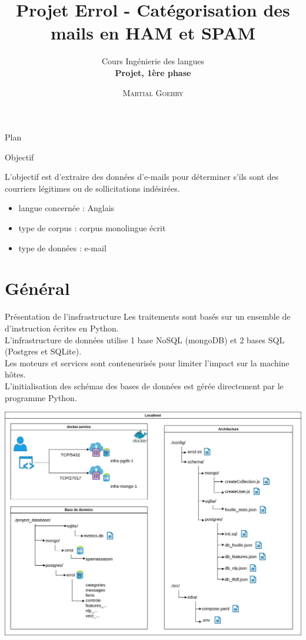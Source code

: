 \documentclass[xelatex,11pt, xcolor=dvipsnames]{beamer}
\subtitle{Cours Ingénierie des langues\\\textbf{Projet, 1ère phase}}
\institute{\normalsize Université Paris 8, LIASD\\
Licence d'informatique}
\title{Projet Errol - Catégorisation des mails en HAM et SPAM}
\author[\textsc{M. Goehry}]{\textsc{Martial Goehry}}
\begin{document}
{ 
  \begin{frame}
  \titlepage
  \end{frame}

\note{
}
}

\begin{frame}{Plan}
  \tableofcontents[sectionstyle=show/show, hidesubsections]
\note{
}  
\end{frame}

\begin{frame}{Objectif}
	\begin{block}{}
		L'objectif est d'extraire des données d'e-mails pour déterminer s'ils sont des courriers légitimes ou de sollicitations indésirées.
	\end{block}
	\begin{itemize}
		\item langue concernée : Anglais
		\item type de corpus : corpus monolingue écrit
		\item type de données : e-mail
	\end{itemize}
\end{frame}


\section{Général}

\begin{frame}{Présentation de l'insfrastructure}
	Les traitements sont basés sur un ensemble de d'instruction écrites en Python.\\
	L'infrastructure de données utilise 1 base NoSQL (mongoDB) et 2 bases SQL (Postgres et SQLite).\\
	Les moteurs et services sont conteneurisés pour limiter l'impact sur la machine hôtes.\\
	L'initialisation des schémas des bases de données est gérée directement par le programme Python.\\
\end{frame}

\begin{frame}
	\includegraphics[width=\linewidth]{img/SchemaDocker}
\end{frame}
\end{document}
